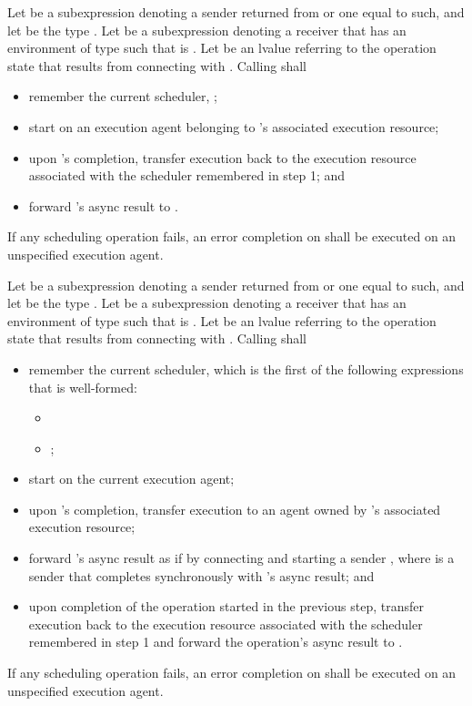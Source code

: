 \pnum
Let  be a subexpression denoting
a sender returned from  or one equal to such, and
let  be the type .
Let  be a subexpression denoting a receiver
that has an environment of type 
such that  is .
Let  be an lvalue referring to the operation state
that results from connecting  with .
Calling  shall
\begin{itemize}
\item
remember the current scheduler, ;
\item
start  on an execution agent belonging to
's associated execution resource;
\item
upon 's completion,
transfer execution back to the execution resource
associated with the scheduler remembered in step 1; and
\item
forward 's async result to .
\end{itemize}
If any scheduling operation fails,
an error completion on  shall be executed
on an unspecified execution agent.

\pnum
Let  be a subexpression denoting
a sender returned from  or one equal to such, and
let  be the type .
Let  be a subexpression denoting a receiver
that has an environment of type 
such that  is .
Let  be an lvalue referring to the operation state
that results from connecting  with .
Calling  shall
\begin{itemize}
\item
remember the current scheduler,
which is the first of the following expressions that is well-formed:
\begin{itemize}
\item {}
\item {};
\end{itemize}
\item
start  on the current execution agent;
\item
upon 's completion,
transfer execution to an agent
owned by 's associated execution resource;
\item
forward 's async result as if by
connecting and starting a sender ,
where  is a sender
that completes synchronously with 's async result; and
\item
upon completion of the operation started in the previous step,
transfer execution back to the execution resource
associated with the scheduler remembered in step 1 and
forward the operation's async result to .
\end{itemize}
If any scheduling operation fails,
an error completion on  shall be executed on
an unspecified execution agent.

